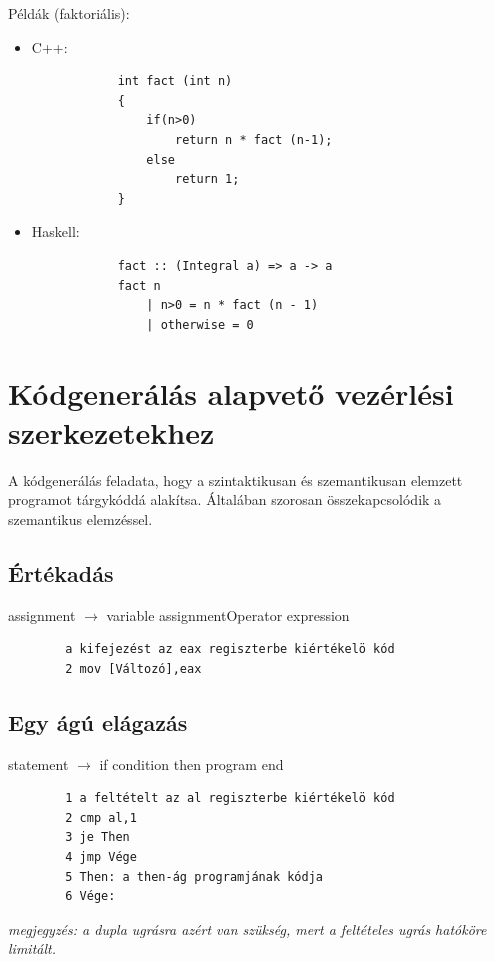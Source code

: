 \documentclass[margin=0px]{article}
\begin{document}
\noindent Példák (faktoriális):

\begin{itemize}
    \item	C++:
          \begin{verbatim}
            int fact (int n)
            {
                if(n>0)
                    return n * fact (n-1);
                else
                    return 1;
            }
        \end{verbatim}

    \item	Haskell:
          \begin{verbatim}
            fact :: (Integral a) => a -> a  
            fact n
                | n>0 = n * fact (n - 1)  
                | otherwise = 0
        \end{verbatim}

\end{itemize}

\section{Kódgenerálás alapvető vezérlési szerkezetekhez}


A kódgenerálás feladata, hogy a szintaktikusan és szemantikusan elemzett programot tárgykóddá alakítsa. Általában szorosan összekapcsolódik a
szemantikus elemzéssel.

\subsection{Értékadás}

assignment $ \rightarrow $ variable assignmentOperator expression

\begin{verbatim}
		a kifejezést az eax regiszterbe kiértékelö kód
		2 mov [Változó],eax
	\end{verbatim}

\subsection{Egy ágú elágazás}
statement $ \rightarrow $ if condition then program end

\begin{verbatim}
		1 a feltételt az al regiszterbe kiértékelö kód
		2 cmp al,1
		3 je Then
		4 jmp Vége
		5 Then: a then-ág programjának kódja
		6 Vége:
	\end{verbatim}

\textit{megjegyzés: a dupla ugrásra azért van szükség, mert a feltételes ugrás hatóköre limitált.}
\end{document}
